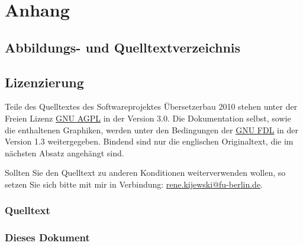 \documentclass[10pt,a4paper,ngerman,titlepage,tocindentauto]{article}
\begin{document}
	\section{Anhang}
		\subsection{Abbildungs- und Quelltextverzeichnis}
			\listoffigures
			\lstlistoflistings
		
		\subsection{Lizenzierung}
			Teile des Quelltextes des Softwareprojektes Übersetzerbau 2010 stehen unter der Freien
			Lizenz \href{http://www.gnu.org/licenses/agpl-3.0.html}{GNU AGPL} in der Version 3.0.
			Die Dokumentation selbst, sowie die enthaltenen Graphiken, werden unter den Bedingungen
			der \href{http://www.gnu.org/licenses/fdl-1.3.html}{GNU FDL} in der Version 1.3 weitergegeben.
			Bindend sind nur die englischen Originaltext, die im nächsten Absatz angehängt sind.
			
			Sollten Sie den Quelltext zu anderen Konditionen weiterverwenden wollen, so setzen Sie
			sich bitte mit mir in Verbindung:
			\href{mailto:rene.kijewski@fu-berlin.de?subject=[SWP_CP_2010]}{rene.kijewski@fu-berlin.de}.
			
			\subsubsection{Quelltext}
				\begin{multicols}{3}
					{\tiny}
				\end{multicols}
			
			\subsubsection[Dieses Dokument]{Dieses Dokument}
				\begin{multicols}{3}
					{\tiny}
				\end{multicols}
\end{document}
